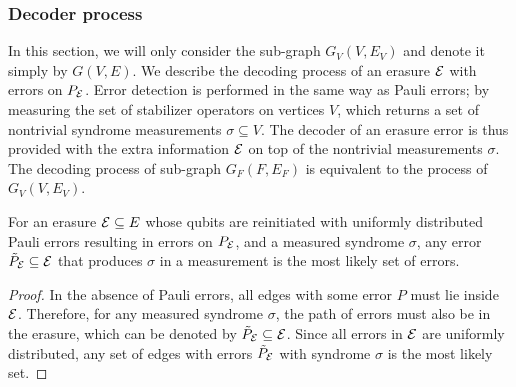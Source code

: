 \subsubsection{Decoder process}
In this section, we will only consider the sub-graph $G_{V}(V,E_V)$ and denote it simply by $G(V,E)$. We describe the decoding process of an erasure $\mathcal{E}$ with errors on $P_{\mathcal{E}}$. Error detection is performed in the same way as Pauli errors; by measuring the set of stabilizer operators on vertices $V$, which returns a set of nontrivial syndrome measurements $\sigma \subseteq V$. The decoder of an erasure error is thus provided with the extra information $\mathcal{E}$ on top of the nontrivial measurements $\sigma$. The decoding process of sub-graph $G_{F}(F,E_F)$ is equivalent to the process of $G_{V}(V,E_V)$.
\begin{lemma}\label{lem:peelinguni}
  For an erasure $\mathcal{E} \subseteq E$ whose qubits are reinitiated with uniformly distributed Pauli errors resulting in errors on $P_{\mathcal{E}}$, and a measured syndrome $\sigma$, any error $\tilde{P}_{\mathcal{E}} \subseteq \mathcal{E}$ that produces $\sigma$ in a measurement is the most likely set of errors.
\end{lemma}
\begin{proof}
  In the absence of Pauli errors, all edges with some error $P$ must lie inside $\mathcal{E}$. Therefore, for any measured syndrome $\sigma$, the path of errors must also be in the erasure, which can be denoted by $\tilde{P}_{\mathcal{E}} \subseteq \mathcal{E}$. Since all errors in $\mathcal{E}$ are uniformly distributed, any set of edges with errors $\tilde{P}_{\mathcal{E}}$ with syndrome $\sigma$ is the most likely set.
\end{proof}

